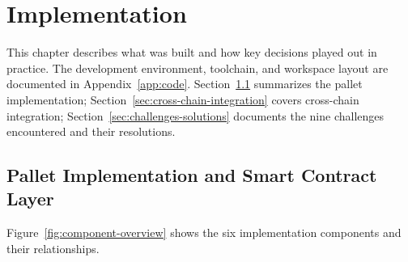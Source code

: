 
\chapter{Implementation}\label{chap:implementation}

This chapter describes what was built and how key decisions played out in practice. The development environment, toolchain, and workspace layout are documented in Appendix~\ref{app:code}. Section~\ref{sec:pallet-impl} summarizes the pallet implementation; Section~\ref{sec:cross-chain-integration} covers cross-chain integration; Section~\ref{sec:challenges-solutions} documents the nine challenges encountered and their resolutions.

\section{Pallet Implementation and Smart Contract Layer}\label{sec:pallet-impl}

Figure~\ref{fig:component-overview} shows the six implementation components and their relationships.

